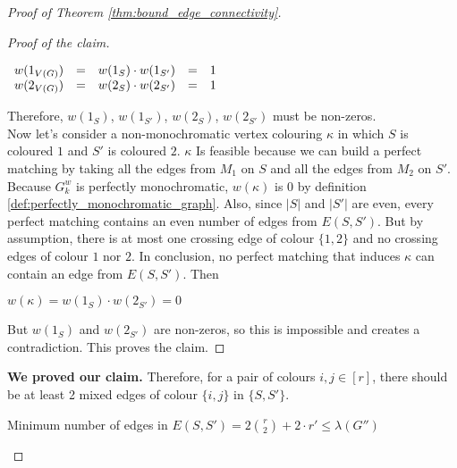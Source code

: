 \begin{proof}[Proof of Theorem \ref{thm:bound_edge_connectivity}]
\begin{enumerate}
\begin{enumerate}
\begin{proof}[Proof of the claim]
                        \begin{center}
                            $\begin{array}{l c l c l}
                                w(1_{V(G)}) & = & w(1_S) \cdot w(1_{S'}) & = & 1 \\
                                w(2_{V(G)}) & = & w(2_S) \cdot w(2_{S'}) & = & 1
                            \end{array}$
                        \end{center}
                        
                        Therefore, $w(1_S)$, $w(1_{S'})$, $w(2_S)$, $w(2_{S'})$ must be non-zeros. \\

                        Now let's consider a non-monochromatic vertex colouring $\kappa$ in which $S$ is coloured $1$ and $S'$ is coloured $2$. $\kappa$ Is feasible because we can build a perfect matching by taking all the edges from $M_1$ on $S$ and all the edges from $M_2$ on $S'$. Because $G_k^w$ is perfectly monochromatic, $w(\kappa)$ is 0 by definition \ref{def:perfectly_monochromatic_graph}. Also, since $|S|$ and $|S'|$ are even, every perfect matching contains an even number of edges from $E(S, S')$. But by assumption, there is at most one crossing edge of colour $\{1, 2\}$ and no crossing edges of colour $1$ nor $2$. In conclusion, no perfect matching that induces $\kappa$ can contain an edge from $E(S, S')$. Then
                        
                        \begin{center}
                            $w(\kappa) = w(1_S) \cdot w(2_{S'}) = 0$
                        \end{center}
                        
                        But $w(1_S)$ and $w(2_{S'})$ are non-zeros, so this is impossible and creates a contradiction. This proves the claim.
                    \end{proof}

                    \textbf{We proved our claim.} Therefore, for a pair of colours $i, j \in [r]$, there should be at least 2 mixed edges of colour $\{i, j\}$ in $\{S, S'\}$.
                    
                    \begin{center}
                        Minimum number of edges in $E(S, S') = 2 {r \choose 2} + 2 \cdot r' \leq \lambda(G'')$
                    \end{center}
                    

\end{enumerate}
\end{enumerate}
\end{proof}
